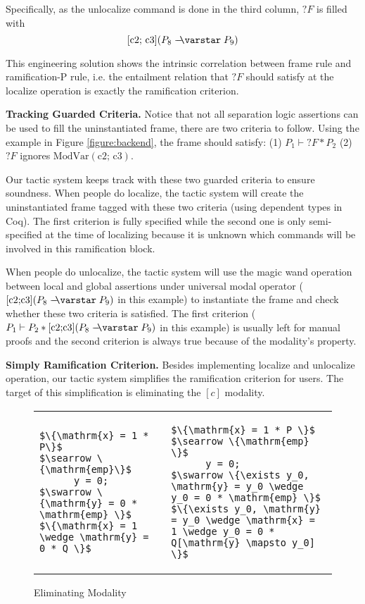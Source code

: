 Specifically, as the unlocalize command is done in the third column, $?F$ is filled with $$[\text{c2; c3}](P_8 \wand P_9)$$

This engineering solution shows the intrinsic correlation between frame rule and ramification-P rule, i.e. the entailment relation that $?F$ should satisfy at the localize operation is exactly the ramification criterion.

\textbf{Tracking Guarded Criteria.} Notice that not all separation logic assertions can be used to fill the uninstantiated frame, there are two criteria to follow. Using the example in Figure \ref{figure:backend}, the frame should satisfy: (1) $P_1 \vdash ?F * P_2$ (2) $?F$ ignores $\mathrm{ModVar}(\text{c2; c3})$.

Our tactic system keeps track with these two guarded criteria to ensure soundness. When people do localize, the tactic system will create the uninstantiated frame tagged with these two criteria (using dependent types in Coq). The first criterion is fully specified while the second one is only semi-specified at the time of localizing because it is unknown which commands will be involved in this ramification block.

When people do unlocalize, the tactic system will use the magic wand operation between local and global assertions under universal modal operator ($[\text{c2;c3}](P_8 \wand P_9)$ in this example) to instantiate the frame and check whether these two criteria is satisfied. The first criterion ($P_1 \vdash P_2 * [\text{c2;c3}](P_8 \wand P_9)$ in this example) is usually left for manual proofs and the second criterion is always true because of the modality's property.

\textbf{Simply Ramification Criterion.} Besides implementing localize and unlocalize operation, our tactic system simplifies the ramification criterion for users. The target of this simplification is eliminating the $[c]$ modality. 

\begin{figure}[h]
\begin{tabular}{l | l}
\begin{lstlisting}
$\{\mathrm{x} = 1 * P\}$
$\searrow \{\mathrm{emp}\}$
      y = 0;
$\swarrow \{\mathrm{y} = 0 * \mathrm{emp} \}$
$\{\mathrm{x} = 1 \wedge \mathrm{y} = 0 * Q \}$
\end{lstlisting} &
\begin{lstlisting}
$\{\mathrm{x} = 1 * P \}$
$\searrow \{\mathrm{emp} \}$
      y = 0;
$\swarrow \{\exists y_0, \mathrm{y} = y_0 \wedge y_0 = 0 * \mathrm{emp} \}$
$\{\exists y_0, \mathrm{y} = y_0 \wedge \mathrm{x} = 1 \wedge y_0 = 0 * Q[\mathrm{y} \mapsto y_0] \}$
\end{lstlisting}
\end{tabular}
\caption{Eliminating Modality}
\label{figure:modality}
\end{figure}

